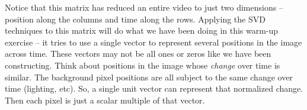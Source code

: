 Notice that this matrix has reduced an entire video to just two dimensions -- position along the columns and time along the rows. Applying the SVD techniques to this matrix will do what we have been doing in this warm-up exercise -- it tries to use a single vector to represent several positions in the image across time. These vectors may not be all ones or zeros like we have been constructing. Think about positions in the image whose \textit{change} over time is similar. The background pixel positions are all subject to the same change over time (lighting, etc). So, a single unit vector can represent that normalized change. Then each pixel is just a scalar multiple of that vector.